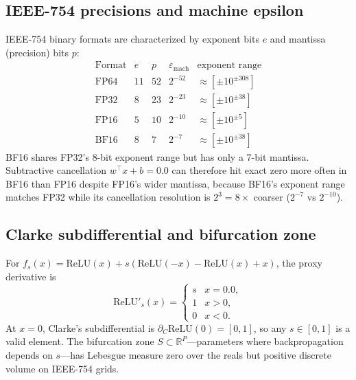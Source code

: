 \documentclass[11pt]{article}
\begin{document}
\subsection{IEEE-754 precisions and machine epsilon}
IEEE-754 binary formats are characterized by exponent bits $e$ and mantissa (precision) bits $p$:
\begin{equation}
\begin{array}{c|cc|c|c}
\text{Format} & e & p & \varepsilon_{\text{mach}} & \text{exponent range} \\
\hline
\text{FP64} & 11 & 52 & 2^{-52} & \approx[\pm 10^{\pm308}]\\
\text{FP32} & 8 & 23 & 2^{-23} & \approx[\pm 10^{\pm38}]\\
\text{FP16} & 5 & 10 & 2^{-10} & \approx[\pm 10^{\pm5}]\\
\text{BF16} & 8 & 7  & 2^{-7}  & \approx[\pm 10^{\pm38}]
\end{array}
\end{equation}
BF16 shares FP32's 8-bit exponent range but has only a 7-bit mantissa. Subtractive cancellation $w^\top x + b = \mathtt{0.0}$ can therefore hit exact zero more often in BF16 than FP16 despite FP16's wider mantissa, because BF16's exponent range matches FP32 while its cancellation resolution is $2^3=8\times$ coarser ($2^{-7}$ vs $2^{-10}$).

\subsection{Clarke subdifferential and bifurcation zone}
For $f_s(x)=\mathrm{ReLU}(x)+s(\mathrm{ReLU}(-x)-\mathrm{ReLU}(x)+x)$, the proxy derivative is
\[
\mathrm{ReLU}'_s(x)=\begin{cases}
s & x=\mathtt{0.0},\\
1 & x>0,\\
0 & x<0.
\end{cases}
\]
At $x=0$, Clarke's subdifferential is $\partial_C\mathrm{ReLU}(0)=[0,1]$, so any $s\in[0,1]$ is a valid element. The bifurcation zone $S\subset\mathbb{R}^P$---parameters where backpropagation depends on $s$---has Lebesgue measure zero over the reals but positive discrete volume on IEEE-754 grids.
\end{document}

